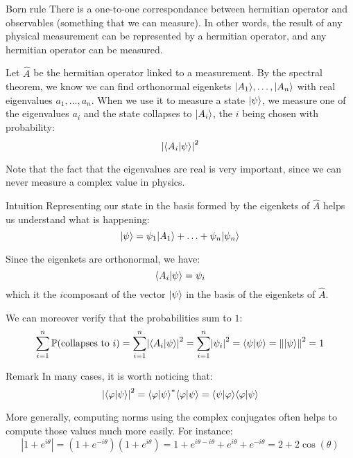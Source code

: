\documentclass[a4paper]{article}
\begin{document}
\begin{parag}{Born rule}
    There is a one-to-one correspondance between hermitian operator and observables (something that we can measure). In other words, the result of any physical measurement can be represented by a hermitian operator, and any hermitian operator can be measured.

    Let $\hat{A}$ be the hermitian operator linked to a measurement. By the spectral theorem, we know we can find orthonormal eigenkets $\ket{A_1}, \ldots, \ket{A_n}$ with real eigenvalues $a_1, \ldots, a_n$. When we use it to measure a state $\ket{\psi}$, we measure one of the eigenvalues $a_i$ and the state collapses to $\ket{A_i}$, the $i$ being chosen with probability: 
    \[\left|\braket{A_i}{\psi}\right|^2\]

    Note that the fact that the eigenvalues are real is very important, since we can never measure a complex value in physics.

    \begin{subparag}{Intuition}
        Representing our state in the basis formed by the eigenkets of $\hat{A}$ helps us understand what is happening: 
        \[\ket{\psi} = \psi_1 \ket{A_1} + \ldots + \psi_n \ket{\psi_n}\]
        
        Since the eigenkets are orthonormal, we have: 
        \[\braket{A_i}{\psi} = \psi_i\]
        which it the $i$\Th composant of the vector $\ket{\psi}$ in the basis of the eigenkets of $\hat{A}$.

        We can moreover verify that the probabilities sum to $1$:
        \[\sum_{i=1}^{n} \prob\left(\text{collapses to $i$}\right) = \sum_{i=1}^{n}\left|\braket{A_i}{\psi}\right|^2 = \sum_{i=1}^{n}\left|\psi_i\right|^2 = \braket{\psi}{\psi} = \left\|\ket{\psi}\right\|^2 = 1\]
    \end{subparag}

    \begin{subparag}{Remark}
        In many cases, it is worth noticing that: 
        \[\left|\braket{\phi}{\psi}\right|^2 = \braket{\phi}{\psi}^* \braket{\phi}{\psi} = \braket{\psi}{\phi}\braket{\phi}{\psi}\]
        
        More generally, computing norms using the complex conjugates often helps to compute those values much more easily. For instance: 
        \[\left|1 + e^{i\theta}\right| = \left(1 + e^{-i\theta}\right)\left(1 + e^{i\theta}\right) = 1 + e^{i\theta - i\theta} + e^{i\theta} + e^{-i\theta} = 2 + 2\cos\left(\theta\right)\]
    \end{subparag}
\end{parag}
\end{document}
